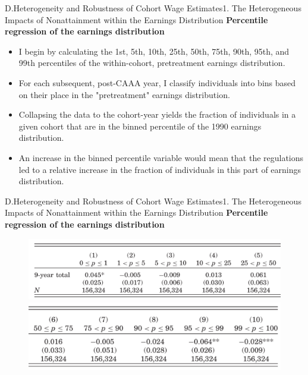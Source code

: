 \documentclass{beamer}
\begin{document}
\begin{frame}{D.Heterogeneity and Robustness of Cohort Wage Estimates}{1. The Heterogeneous Impacts of Nonattainment within the	Earnings Distribution}
	\textbf{Percentile regression of the earnings distribution}
	\begin{itemize}
		\item I begin by calculating the 1st, 5th, 10th, 25th, 50th, 75th, 90th, 95th, and 99th percentiles of the within-cohort, pretreatment earnings distribution.
		\item For each subsequent, post-CAAA year, I classify individuals into bins based on their place in the "pretreatment" earnings distribution.
		\item Collapsing the data to the cohort-year yields the fraction of individuals in a given cohort that are in the binned percentile of the 1990 earnings distribution.
		\item An increase in the binned percentile variable would mean that the regulations led to a relative increase in the fraction of individuals in this part of earnings distribution.
	\end{itemize}
\end{frame}
\begin{frame}{D.Heterogeneity and Robustness of Cohort Wage Estimates}{1. The Heterogeneous Impacts of Nonattainment within the	Earnings Distribution}
	\textbf{Percentile regression of the earnings distribution}
	\begin{figure}[h]
		\centering
		\includegraphics[scale=0.7]{table5_1.png}
		\includegraphics[scale=0.7]{table5_2.png}
	\end{figure}
\end{frame}
\end{document}
